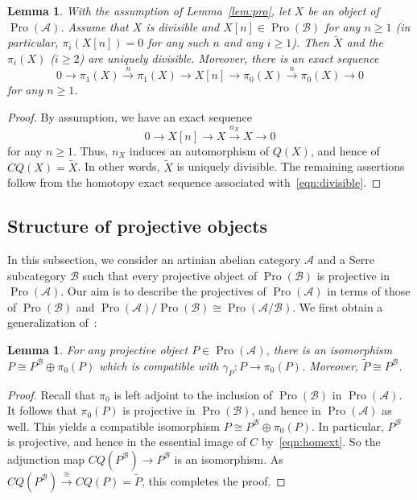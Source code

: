 \documentclass[11pt]{article}
\newtheorem{lemm}[theo]{Lemma}
\theoremstyle{definition}
\numberwithin{equation}{section}
\newcommand\cA{{\mathcal A}}
\newcommand\cB{{\mathcal B}}
\newcommand\tP{{\widetilde P}}
\newcommand\tX{{\widetilde X}}
\DeclareMathOperator{\Pro}{Pro}
\theoremstyle{remark}
\begin{document}
\begin{lemm}\label{lem:tors}
With the assumption of Lemma~\ref{lem:pro}, let $X$ be an object of $\Pro(\cA)$. Assume that $X$ is divisible and $X[n] \in \Pro(\cB)$ for any $n \geq 1$ (in particular, $\pi_i(X[n]) = 0$ for any such $n$ and any $i \geq 1$). Then $\tX$ and the $\pi_i(X)$ ($i \geq 2$) are uniquely divisible. Moreover, there is an exact sequence
\[
0 \longrightarrow \pi_1(X)
\stackrel{n}{\longrightarrow} \pi_1(X)
\longrightarrow X[n] \longrightarrow \pi_0(X)
\stackrel{n}{\longrightarrow} \pi_0(X)
\longrightarrow 0
\]
for any $n \geq 1$.
\end{lemm}


\begin{proof}
By assumption, we have an exact sequence
\begin{equation}\label{eqn:divisible}
0 \longrightarrow X[n] \longrightarrow X
\stackrel{n_X}{\longrightarrow} X \longrightarrow 0
\end{equation}
for any $n \geq 1$. Thus, $n_X$ induces an automorphism of $Q(X)$, and hence of $CQ(X) = \tX$. In other words, $\tX$ is uniquely divisible. The remaining assertions follow from the homotopy exact sequence associated with~\eqref{eqn:divisible}.
\end{proof}


\subsection{Structure of projective objects}\label{subsec:proj}

In this subsection, we consider an artinian abelian category $\cA$ and a Serre subcategory $\cB$ such that every projective object of $\Pro(\cB)$ is projective in $\Pro(\cA)$. Our aim is to describe the projectives of $\Pro(\cA)$ in terms of those of $\Pro(\cB)$ and $\Pro(\cA)/\Pro(\cB) \cong \Pro(\cA/\cB)$. We first obtain a generalization of~\cite[V.3.3.9]{DG}:


\begin{lemm}\label{lem:proj}
For any projective object $P \in \Pro(\cA)$, there is an isomorphism $P \cong P^{\cB} \oplus \pi_0(P)$ which is compatible with $\gamma_P : P \to \pi_0(P)$. Moreover, $\tP \cong P^{\cB}$.
\end{lemm}

\begin{proof}
Recall that $\pi_0$ is left adjoint to the inclusion of $\Pro(\cB)$ in $\Pro(\cA)$. It follows that $\pi_0(P)$ is projective in $\Pro(\cB)$, and hence in $\Pro(\cA)$ as well. This yields a compatible isomorphism $P \cong P^{\cB} \oplus \pi_0(P)$. In particular, $P^{\cB}$ is projective, and hence in the essential image of $C$ by~\eqref{eqn:homext}. So the adjunction map $CQ(P^{\cB}) \to P^{\cB}$ is an isomorphism. As $CQ(P^{\cB}) \stackrel{\cong}{\to} CQ(P) = \tP$, this completes the proof.
\end{proof}
\end{document}
